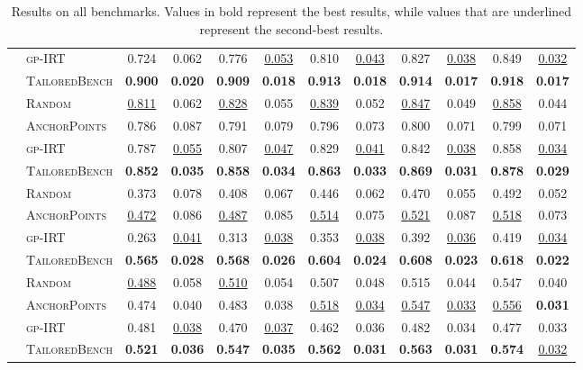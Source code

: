 \begin{table*}[ht]
\begin{tabular}{cl*{5}{cc}}
&\textsc{gp-IRT}         & 0.724 & 0.062 & 0.776 & \uline{0.053} & 0.810 & \uline{0.043} & 0.827 & \uline{0.038} & 0.849 & \uline{0.032} \\ 
                           & \textsc{TailoredBench} & \textbf{0.900} & \textbf{0.020} & \textbf{0.909} & \textbf{0.018} & \textbf{0.913} & \textbf{0.018} & \textbf{0.914} & \textbf{0.017} & \textbf{0.918} & \textbf{0.017} \\
\hdashline
\multirow{4}{*}{GSM8K}&\textsc{Random}        & \uline{0.811} & 0.062 & \uline{0.828} & 0.055 & \uline{0.839} & 0.052 & \uline{0.847} & 0.049 & \uline{0.858} & 0.044 \\
&\textsc{AnchorPoints} & 0.786 & 0.087 & 0.791 & 0.079 & 0.796 & 0.073 & 0.800 & 0.071 & 0.799 & 0.071 \\
&\textsc{gp-IRT}        & 0.787 & \uline{0.055} & 0.807 & \uline{0.047} & 0.829 & \uline{0.041} & 0.842 & \uline{0.038} & 0.858 & \uline{0.034} \\ 
                           &\textsc{TailoredBench} & \textbf{0.852} & \textbf{0.035} & \textbf{0.858} & \textbf{0.034} & \textbf{0.863} & \textbf{0.033} & \textbf{0.869} & \textbf{0.031} & \textbf{0.878} & \textbf{0.029} \\
\hdashline
\multirow{4}{*}{Winogrande}&\textsc{Random}        & 0.373 & 0.078 & 0.408 & 0.067 & 0.446 & 0.062 & 0.470 & 0.055 & 0.492 & 0.052 \\
&\textsc{AnchorPoints} & \uline{0.472} & 0.086 & \uline{0.487} & 0.085 & \uline{0.514} & 0.075 & \uline{0.521} & 0.087 & \uline{0.518} & 0.073 \\
&\textsc{gp-IRT}        & 0.263 & \uline{0.041} & 0.313 & \uline{0.038} & 0.353 & \uline{0.038} & 0.392 & \uline{0.036} & 0.419 & \uline{0.034} \\ 
                           & \textsc{TailoredBench} & \textbf{0.565} & \textbf{0.028} & \textbf{0.568} & \textbf{0.026} & \textbf{0.604} & \textbf{0.024} & \textbf{0.608} & \textbf{0.023} & \textbf{0.618} & \textbf{0.022} \\
\hdashline
\multirow{4}{*}{POPE}&\textsc{Random}        & \uline{0.488} & 0.058 & \uline{0.510} & 0.054 & 0.507 & 0.048 & 0.515 & 0.044 & 0.547 & 0.040 \\
&\textsc{AnchorPoints} & 0.474 & 0.040 & 0.483 & 0.038 & \uline{0.518} & \uline{0.034} & \uline{0.547} & \uline{0.033} & \uline{0.556} & \textbf{0.031} \\
&\textsc{gp-IRT}        & 0.481 & \uline{0.038} & 0.470 & \uline{0.037} & 0.462 & 0.036 & 0.482 & 0.034 & 0.477 & 0.033 \\ 
                           &\textsc{TailoredBench} & \textbf{0.521} & \textbf{0.036} & \textbf{0.547} & \textbf{0.035} & \textbf{0.562} & \textbf{0.031} & \textbf{0.563} & \textbf{0.031} & \textbf{0.574} & \uline{0.032} \\
\bottomrule
\end{tabular}
\caption{Results on all benchmarks. Values in bold represent the best results, while values that are underlined represent the second-best results.}
\label{tab:apdallresult}
\end{table*}
